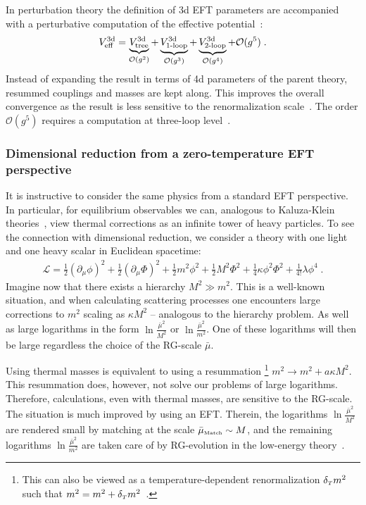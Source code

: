 \documentclass[11pt]{article}
\newcommand{\T}{\rmii{$T$}}
\newcommand{\bmu}{\bar\mu}
\renewcommand{\rmi}[1]{{\mbox{\scriptsize #1}}}
\newcommand{\rmii}[1]{{\mbox{\tiny\rm{#1}}}}
\begin{document}
In perturbation theory
the definition of 3d EFT parameters are accompanied with
a perturbative computation of 
the effective potential~\cite{Farakos:1994kx}:
\begin{align}
V^{\text{3d}}_{\text{eff}} =     
    \underbrace{V^{\rmi{3d}}_{\rmi{tree}}}_{\mathcal{O}(g^2)}
  + \underbrace{V^{\rmi{3d}}_{\rmi{1-loop}}}_{\mathcal{O}(g^3)}
  + \underbrace{V^{\rmi{3d}}_{\rmi{2-loop}}}_{\mathcal{O}(g^4)}
  + \mathcal{O}(g^5)
  \;.
\end{align}
Instead of expanding the result in terms of 4d parameters of the parent theory,  
resummed couplings and masses are kept along.
This improves the overall convergence as the result is less sensitive to
the renormalization scale~\cite{Laine:2006cp,Ghiglieri:2020dpq}.
The order $\mathcal{O}(g^5)$ requires a computation at
three-loop level~\cite{Rajantie:1996np,Moller:2012chx,Laine:2018lgj}.


\subsubsection*{Dimensional reduction from a zero-temperature EFT perspective}

It is instructive to consider the same physics from a standard EFT perspective.
In particular, for equilibrium observables we can, analogous to
Kaluza-Klein theories~\cite{Overduin:1997sri},
view thermal corrections as an infinite tower of heavy particles.
To see the connection with dimensional reduction,
we consider a theory with
one light and
one heavy scalar in Euclidean spacetime:
\begin{align}
  \mathcal{L}=
    \frac{1}{2}(\partial_\mu \phi)^2
  + \frac{1}{2}(\partial_\mu \Phi)^2
  + \frac{1}{2}m^2 \phi^2
  + \frac{1}{2}M^2\Phi^2
  + \frac{1}{4}\kappa  \phi^2 \Phi^2
  + \frac{1}{4!}\lambda  \phi^4
  \;.
\end{align}
Imagine now that there exists a hierarchy
$M^2\gg m^2$. 
This is a well-known situation, and when calculating scattering processes one encounters large corrections to $m^2$ scaling as
$\kappa M^2$ --
analogous to the hierarchy problem.
As well as large logarithms in the form
$\ln\frac{\bmu^2}{M^2}$ or
$\ln\frac{\bmu^2}{m^2}$.
One of these logarithms will then be large regardless the choice of
the RG-scale $\bmu$.

Using thermal masses is equivalent to using a resummation%
\footnote{
  This can also be viewed as a temperature-dependent renormalization $\delta_\T m^2$ such that $m^2 = m^2 + \delta_\T m^2$~\cite{Niemi:2021qvp}.
}
$m^2 \to m^2+ a \kappa M^2$.
This resummation does, however,
not solve our problems of large logarithms.
Therefore, calculations, even with thermal masses, are sensitive to the RG-scale.
The situation is much improved by using an EFT.
Therein,
the logarithms
$\ln\frac{\bmu^2}{M^2}$ are rendered small by matching at the scale
$\bmu_\rmii{Match}\sim M$, and
the remaining logarithms
$\ln\frac{\bmu^2}{m^2}$
are taken care of by RG-evolution in the low-energy theory~\cite{Cohen:2019wxr}.
\end{document}
